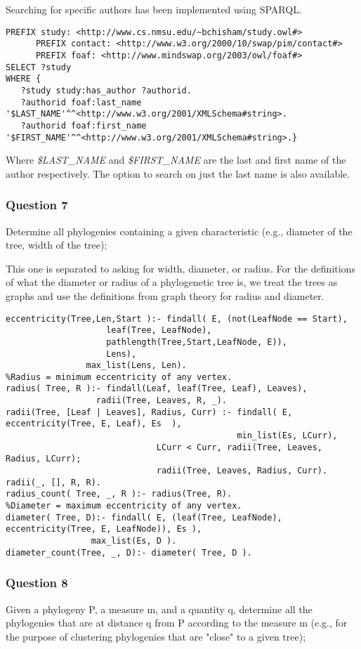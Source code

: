 \documentclass[10pt]{article}
\begin{document}
Searching for specific authors has been implemented using SPARQL.

\begin{verbatim}
PREFIX study: <http://www.cs.nmsu.edu/~bchisham/study.owl#>
      PREFIX contact: <http://www.w3.org/2000/10/swap/pim/contact#>
      PREFIX foaf: <http://www.mindswap.org/2003/owl/foaf#>
SELECT ?study
WHERE {
   ?study study:has_author ?authorid.
   ?authorid foaf:last_name '$LAST_NAME'^^<http://www.w3.org/2001/XMLSchema#string>.
   ?authorid foaf:first_name '$FIRST_NAME'^^<http://www.w3.org/2001/XMLSchema#string>.}
\end{verbatim}

Where \emph{\$LAST\_NAME} and \emph{\$FIRST\_NAME} are the last and first name
of the author respectively.  The option to search on just the last name is also
available.

\subsubsection{Question 7}
Determine all phylogenies containing a given characteristic (e.g., diameter of the tree, width of the tree);

This one is separated to asking for width, diameter, or radius.  For the
definitions of what the diameter or radius of a phylogenetic tree is, we treat
the trees as graphs and use the definitions from graph theory for radius and
diameter.
\begin{verbatim}
eccentricity(Tree,Len,Start ):- findall( E, (not(LeafNode == Start),
					leaf(Tree, LeafNode), 
					pathlength(Tree,Start,LeafNode, E)), 
					Lens),
				max_list(Lens, Len).
%Radius = minimum eccentricity of any vertex.
radius( Tree, R ):- findall(Leaf, leaf(Tree, Leaf), Leaves),
	       	      radii(Tree, Leaves, R, _).
radii(Tree, [Leaf | Leaves], Radius, Curr) :- findall( E, eccentricity(Tree, E, Leaf), Es  ),
	                           		          min_list(Es, LCurr),
					          LCurr < Curr, radii(Tree, Leaves, Radius, LCurr);
					          radii(Tree, Leaves, Radius, Curr).
radii(_, [], R, R).
radius_count( Tree, _, R ):- radius(Tree, R).
%Diameter = maximum eccentricity of any vertex.
diameter( Tree, D):- findall( E, (leaf(Tree, LeafNode), eccentricity(Tree, E, LeafNode)), Es ), 
		         max_list(Es, D ).
diameter_count(Tree, _, D):- diameter( Tree, D ).
\end{verbatim}

\subsubsection{Question 8}
Given a phylogeny P, a measure m, and a quantity q, determine all the
phylogenies that are at distance q from P according to the measure m (e.g., for
the purpose of clustering phylogenies that are "close" to a given tree);
\end{document}
